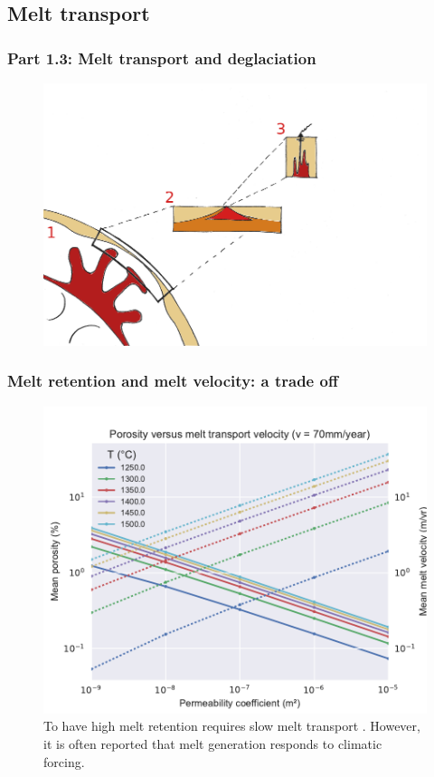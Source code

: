 \documentclass[aspectratio=169]{beamer}
\begin{document}
\subsection{Melt transport}

\begin{frame}
    \frametitle{Part 1.3: Melt transport and deglaciation}
    \begin{figure}
        \includegraphics[height=0.9\paperheight]{./pictures/drawing.png}
    \end{figure}
\end{frame}

\begin{frame}
    \frametitle{Melt retention and melt velocity: a trade off}
    \begin{figure}
        \includegraphics[height=0.7\paperheight]{./figures/ch2-phi-vm.pdf}
        \caption{To have high melt retention requires slow melt transport \citep{franken-etal-2020}. However, it is
                 often reported that melt generation responds to climatic forcing.}
    \end{figure}
\end{frame}
\end{document}
